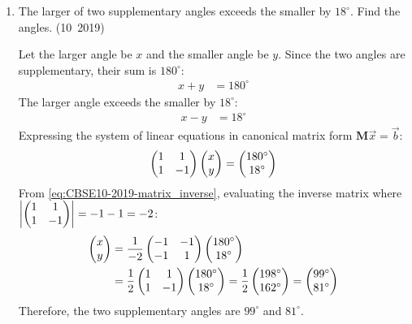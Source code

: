 \begin{enumerate}[label=\thesubsection.\arabic*, ref=\thesubsection.\theenumi]
	\solution
	The maximum frequency is $50$, corresponding to the modal class $35$--$40$.
	From the modal class:
	\begin{align}
		l = 35, \quad h = 5, \quad f_1 = 50, \quad f_0 = 34, \quad f_2 = 42
	\end{align}
	From \eqref{eq:CBSE10-2019-mode}, the mode is given by:
	\begin{align}
		\text{Mode} &= l + \brak{\frac{f_1 - f_0}{2f_1 - f_0 - f_2}} \times h \\
		&= 35 + \brak{\frac{50 - 34}{2\brak{50} - 34 - 42}} \times 5 \\
		&= 35 + \brak{\frac{16}{24}} \times 5 = 35 + \frac{10}{3} \approx 38.33
	\end{align}
	
	\item The larger of two supplementary angles exceeds the smaller by $18^\circ$. Find the angles.
	\hfill (10~2019)
	
	\solution
	Let the larger angle be $x$ and the smaller angle be $y$.
	Since the two angles are supplementary, their sum is $180^\circ$:
	\begin{align}
		x + y &= 180^\circ \label{eq:EE26BTECH11223-10-q11-eq1}
	\end{align}
	The larger angle exceeds the smaller by $18^\circ$:
	\begin{align}
		x - y &= 18^\circ \label{eq:EE26BTECH11223-10-q11-eq2}
	\end{align}
	Expressing the system of linear equations in canonical matrix form $\mathbf{M}\vec{x} = \vec{b}$:
	\begin{align}
		\begin{pmatrix}1 & 1 \\ 1 & -1\end{pmatrix}\begin{pmatrix}x \\ y\end{pmatrix} = \begin{pmatrix}180^\circ \\ 18^\circ\end{pmatrix}
	\end{align}
	From \eqref{eq:CBSE10-2019-matrix_inverse}, evaluating the inverse matrix where $\begin{vmatrix}\begin{pmatrix}1 & 1 \\ 1 & -1\end{pmatrix}\end{vmatrix} = -1 - 1 = -2$:
	\begin{align}
		\begin{pmatrix}x \\ y\end{pmatrix} &= \frac{1}{-2}\begin{pmatrix}-1 & -1 \\ -1 & 1\end{pmatrix}\begin{pmatrix}180^\circ \\ 18^\circ\end{pmatrix} \\
		&= \frac{1}{2}\begin{pmatrix}1 & 1 \\ 1 & -1\end{pmatrix}\begin{pmatrix}180^\circ \\ 18^\circ\end{pmatrix} = \frac{1}{2}\begin{pmatrix}198^\circ \\ 162^\circ\end{pmatrix} = \begin{pmatrix}99^\circ \\ 81^\circ\end{pmatrix}
	\end{align}
	Therefore, the two supplementary angles are $99^\circ$ and $81^\circ$.
	

\end{enumerate}
